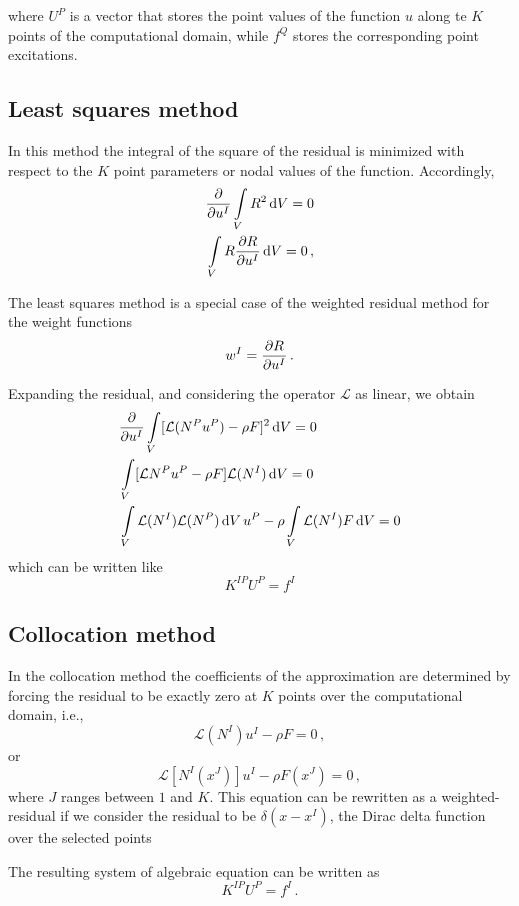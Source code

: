 where $U^P$ is a vector that stores the point values of the function $u$ along te $K$ points of the computational domain, while $f^Q$ stores the corresponding point excitations.

\subsection{Least squares method}
In this method the integral of the square of the residual is minimized with respect to the $K$ point parameters or nodal values of the function. Accordingly,
\begin{align*}
  &\pdv{u^I}\int\limits_V R^2 \dd{V} = 0\\
  &\int\limits_V R \pdv{R}{u^I} \dd{V} = 0\, ,
\end{align*}

The least squares method is a special case of the weighted residual method for the weight functions
\[w^I = \pdv{R}{u^I}\, .\]

Expanding the residual, and considering the operator $\mathcal{L}$ as linear, we obtain
\begin{align*}
  &\pdv{u^I}\int\limits_V [\mathcal{L}(N^P u^P) - \rho F]^2 \dd{V} = 0\\
  &\int\limits_V [\mathcal{L} N^P u^P - \rho F] \mathcal{L}(N^I) \dd{V} = 0\\
 &\int\limits_V \mathcal{L}(N^I) \mathcal{L}(N^P) \dd{V} u^P - \rho \int\limits_V \mathcal{L}(N^I) F \dd{V} = 0
\end{align*}
which can be written like
\begin{equation}
  K^{IP} U^P = f^I
  \label{eq:Dsquares}
\end{equation}

\subsection{Collocation method}
In the collocation method the coefficients of the approximation are determined by forcing the residual to be exactly zero at $K$ points over the computational domain, i.e.,
\[\mathcal{L}(N^I) u^I - \rho F = 0\, ,\]
or
\[\mathcal{L}[N^I(x^J)] u^I - \rho F(x^J) = 0\, ,\]
where $J$ ranges between $1$ and $K$. This equation can be rewritten as a weighted-residual if we consider the residual to be $\delta(x - x^I)$, the Dirac delta function over the selected points

The resulting system of algebraic equation can be written as
\begin{equation}
K^{IP} U^P = f^I\, .
\label{eq:Colo}
\end{equation}

